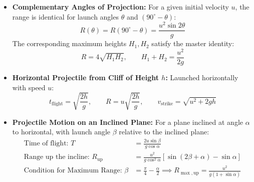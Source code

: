 \documentclass[10pt,a4paper]{article}
\begin{document}
\begin{usecasebox}
\begin{itemize}
  \item \textbf{Complementary Angles of Projection:} For a given initial velocity $u$, the range is identical for launch angles $\theta$ and $(90^\circ - \theta)$:
  \begin{equation}
    R(\theta) = R(90^\circ - \theta) = \frac{u^2\sin 2\theta}{g}
  \end{equation}
  The corresponding maximum heights $H_1, H_2$ satisfy the master identity:
  \begin{equation}
    R = 4\sqrt{H_1 H_2}, \qquad H_1 + H_2 = \frac{u^2}{2g}
  \end{equation}
  \item \textbf{Horizontal Projectile from Cliff of Height $h$:} Launched horizontally with speed $u$:
  \begin{equation}
    t_{\text{flight}} = \sqrt{\frac{2h}{g}}, \qquad R = u\sqrt{\frac{2h}{g}}, \qquad v_{\text{strike}} = \sqrt{u^2 + 2gh}
  \end{equation}
  \item \textbf{Projectile Motion on an Inclined Plane:} For a plane inclined at angle $\alpha$ to horizontal, with launch angle $\beta$ relative to the inclined plane:
  \begin{align}
    \text{Time of flight: } T &= \frac{2u\sin\beta}{g\cos\alpha} \\
    \text{Range up the incline: } R_{\text{up}} &= \frac{u^2}{g\cos^2\alpha}\left[\sin(2\beta + \alpha) - \sin\alpha\right] \\
    \text{Condition for Maximum Range: } \beta &= \frac{\pi}{4} - \frac{\alpha}{2} \implies R_{\max,\text{up}} = \frac{u^2}{g(1 + \sin\alpha)}
  \end{align}
\end{itemize}
\end{usecasebox}
\end{document}
